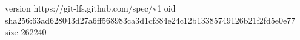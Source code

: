 version https://git-lfs.github.com/spec/v1
oid sha256:63ad628043d27a6ff568983ca3d1cf384e24c12b13385749126b21f2fd5e0e77
size 262240
